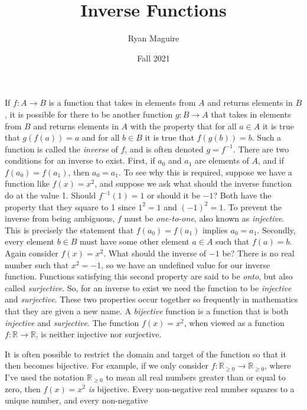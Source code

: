 \documentclass{article}
\title{Inverse Functions}
\author{Ryan Maguire}
\date{Fall 2021}
\begin{document}
    \maketitle
    If $f:A\rightarrow{B}$ is a function that takes in elements from $A$ and
    returns elements in $B$, it is possible for there to be another function
    $g:B\rightarrow{A}$ that takes in elements from $B$ and returns elements
    in $A$ with the property that for all $a\in{A}$ it is true that
    $g(f(a))=a$ and for all $b\in{B}$ it is true that $f(g(b))=b$. Such a
    function is called the \textit{inverse} of $f$, and is often denoted
    $g=f^{-1}$. There are two conditions for an inverse to exist. First,
    if $a_{0}$ and $a_{1}$ are elements of $A$, and if $f(a_{0})=f(a_{1})$,
    then $a_{0}=a_{1}$. To see why this is required, suppose we have a function
    like $f(x)=x^{2}$, and suppose we ask what should the inverse function do
    at the value 1. Should $f^{-1}(1)=1$ or should it be $-1$? Both have the
    property that they square to 1 since $1^{2}=1$ and $(-1)^{2}=1$. To
    prevent the inverse from being ambiguous, $f$ must be
    \textit{one-to-one}, also known as \textit{injective}. This is precisely
    the statement that $f(a_{0})=f(a_{1})$ implies $a_{0}=a_{1}$. Secondly,
    every element $b\in{B}$ must have some other element $a\in{A}$ such that
    $f(a)=b$. Again consider $f(x)=x^{2}$. What should the inverse of $-1$ be?
    There is no real number such that $x^{2}=-1$, so we have an undefined
    value for our inverse function. Functions satisfying this second property
    are said to be \textit{onto}, but also called \textit{surjective}. So, for
    an inverse to exist we need the function to be
    \textit{injective} and \textit{surjective}. These two properties occur
    together so frequently in mathematics that they are given a new name. A
    \textit{bijective} function is a function that is both \textit{injective}
    and \textit{surjective}. The function $f(x)=x^{2}$, when viewed as a
    function $f:\mathbb{R}\rightarrow\mathbb{R}$, is neither injective nor
    surjective.
    \par\hfill\par
    It is often possible to restrict the domain and target of the function
    so that it then becomes bijective. For example, if we only consider
    $f:\mathbb{R}_{\geq{0}}\rightarrow\mathbb{R}_{\geq{0}}$, where I've used
    the notation $\mathbb{R}_{\geq{0}}$ to mean all real numbers greater than
    or equal to zero, then $f(x)=x^{2}$ \textit{is} bijective. Every
    non-negative real number squares to a unique number, and every non-negative
\end{document}
